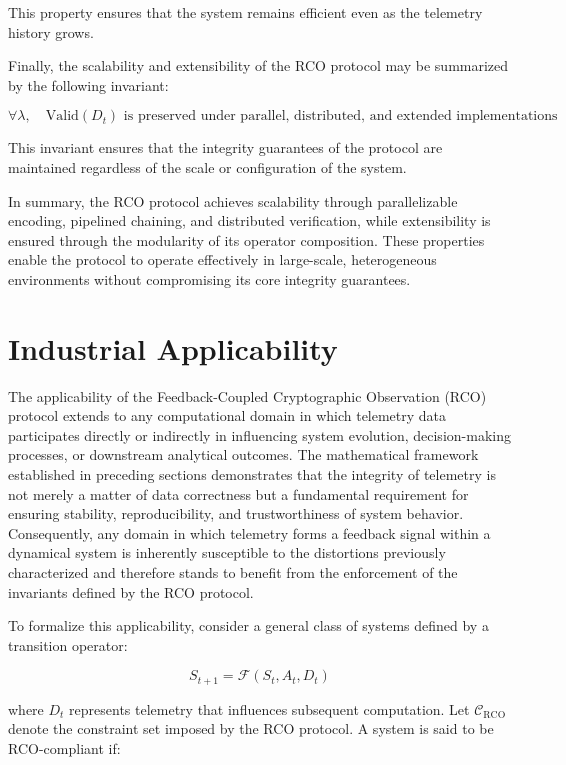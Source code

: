 This property ensures that the system remains efficient even as the telemetry history grows.

Finally, the scalability and extensibility of the RCO protocol may be summarized by the following invariant:

\begin{equation}
\forall \lambda, \quad \text{Valid}(D_t) \text{ is preserved under parallel, distributed, and extended implementations}
\end{equation}

This invariant ensures that the integrity guarantees of the protocol are maintained regardless of the scale or configuration of the system.

In summary, the RCO protocol achieves scalability through parallelizable encoding, pipelined chaining, and distributed verification, while extensibility is ensured through the modularity of its operator composition. These properties enable the protocol to operate effectively in large-scale, heterogeneous environments without compromising its core integrity guarantees.

\section{Industrial Applicability}

The applicability of the Feedback-Coupled Cryptographic Observation (RCO) protocol extends to any computational domain in which telemetry data participates directly or indirectly in influencing system evolution, decision-making processes, or downstream analytical outcomes. The mathematical framework established in preceding sections demonstrates that the integrity of telemetry is not merely a matter of data correctness but a fundamental requirement for ensuring stability, reproducibility, and trustworthiness of system behavior. Consequently, any domain in which telemetry forms a feedback signal within a dynamical system is inherently susceptible to the distortions previously characterized and therefore stands to benefit from the enforcement of the invariants defined by the RCO protocol.

To formalize this applicability, consider a general class of systems defined by a transition operator:

\begin{equation}
S_{t+1} = \mathcal{F}(S_t, A_t, D_t)
\end{equation}

where $D_t$ represents telemetry that influences subsequent computation. Let $\mathcal{C}_{\text{RCO}}$ denote the constraint set imposed by the RCO protocol. A system is said to be RCO-compliant if:

